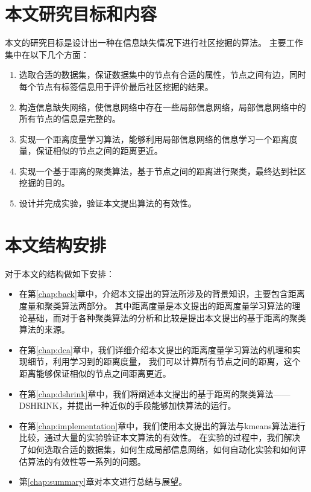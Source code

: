 \section{本文研究目标和内容}

本文的研究目标是设计出一种在信息缺失情况下进行社区挖掘的算法。
主要工作集中在以下几个方面：

\begin{enumerate}
\item 选取合适的数据集，保证数据集中的节点有合适的属性，节点之间有边，同时每个节点有标签信息用于评价最后社区挖掘的结果。
\item 构造信息缺失网络，使信息网络中存在一些局部信息网络，局部信息网络中的所有节点的信息是完整的。
\item 实现一个距离度量学习算法，能够利用局部信息网络的信息学习一个距离度量，保证相似的节点之间的距离更近。
\item 实现一个基于距离的聚类算法，基于节点之间的距离进行聚类，最终达到社区挖掘的目的。
\item 设计并完成实验，验证本文提出算法的有效性。
\end{enumerate}

\section{本文结构安排}

对于本文的结构做如下安排：

\begin{itemize}
    \item 在第\ref{chap:back}章中，介绍本文提出的算法所涉及的背景知识，主要包含距离度量和聚类算法两部分。
        其中距离度量是本文提出的距离度量学习算法的理论基础，而对于各种聚类算法的分析和比较是提出本文提出的基于距离的聚类算法的来源。
    \item 在第\ref{chap:dca}章中，我们详细介绍本文提出的距离度量学习算法的机理和实现细节，利用学习到的距离度量，
        我们可以计算所有节点之间的距离，这个距离能够保证相似的节点之间距离更近。
    \item 在第\ref{chap:dshrink}章中，我们将阐述本文提出的基于距离的聚类算法——DSHRINK，并提出一种近似的手段能够加快算法的运行。
    \item 在第\ref{chap:implementation}章中，我们使用本文提出的算法与kmeans算法进行比较，通过大量的实验验证本文算法的有效性。
    在实验的过程中，我们解决了如何选取合适的数据集，如何生成局部信息网络，如何自动化实验和如何评估算法的有效性等一系列的问题。
    \item 第\ref{chap:summary}章对本文进行总结与展望。
\end{itemize}
